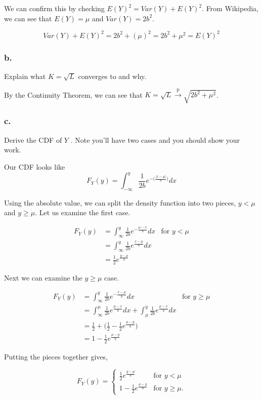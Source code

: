 \documentclass[12pt]{article}
\begin{document}
We can confirm this by checking $ E(Y)^2 = Var(Y) + E(Y)^2$. From Wikipedia, we can see that $E(Y) = \mu$ and $Var(Y) = 2b^2$.

$$Var(Y) + E(Y)^2 = 2b^2 + (\mu)^2 = 2b^2 + \mu^2 = E(Y)^2$$

\subsubsection{b.}
Explain what $K = \sqrt{L}$ converges to and why.

\bigskip

By the Continuity Theorem, we can see that $K = \sqrt{L}  \xrightarrow{\text{p}}  \sqrt{2b^2 +\mu^2}$.

\subsubsection{c.}
Derive the CDF of $Y$ . Note you’ll have two cases and you should show your work.

\bigskip
Our CDF looks like
$$F_Y(y) = \int_{-\infty}^{y}\frac{1}{2b}e^{-\Big(  \frac{|x-\mu |}{b}   \Big) }  dx$$

Using the absolute value, we can split the density function into two pieces, $y< \mu$ and $y\geq \mu$. Let us examine the first case.

\begin{align*}
F_Y(y) & = \int_{\infty}^{y} \frac{1}{2b}e^{-\frac{\mu-x}{b} } dx & \text{for } y <\mu\\
	& =  \int_{\infty}^{y} \frac{1}{2b}e^{\frac{x-\mu}{b} } dx \\
	& = \frac{1}{2} e^{\frac{y-\mu }{b}}
\end{align*}

Next we can examine the $y\geq \mu$ case.

\begin{align*}
F_Y(y) & = \int_{\infty}^{y} \frac{1}{2b}e^{-\frac{x - \mu}{b} } dx & \text{for } y \geq\mu\\
& =  \int_{\infty}^{\mu} \frac{1}{2b}e^{\frac{\mu - x}{b} } dx + \int_{\mu}^{y} \frac{1}{2b}e^{\frac{\mu - x}{b} } dx  \\
& = \frac{ 1}{ 2 } + \Big(\frac{ 1}{ 2 } - \frac{ 1 }{ 2 } e^{\frac{ \mu - y }{ b }}\Big) \\
& = 1 - \frac{ 1 }{ 2 } e^{\frac{ \mu - y }{ b }}
\end{align*}

Putting the pieces together gives,

$$F_Y(y) = \begin{cases}
 \frac{1}{2} e^{\frac{y-\mu }{b}} & \text{for } y <\mu \\
1 - \frac{ 1 }{ 2 } e^{\frac{ \mu - y }{ b }} &  \text{for } y \geq\mu.
\end{cases}$$
\end{document}
